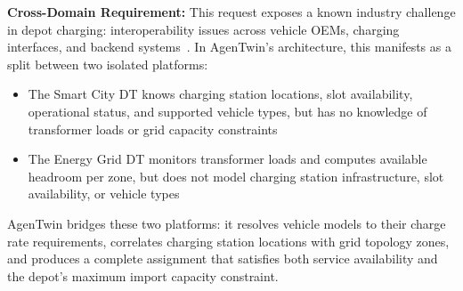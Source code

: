 \textbf{Cross-Domain Requirement:}
This request exposes a known industry challenge in depot charging:
    interoperability issues across vehicle OEMs,
    charging interfaces, and backend systems~\cite{elintacharge2026}.
In AgenTwin's architecture, this manifests as a split between two isolated platforms:

\begin{itemize}
    \item The Smart City DT knows charging station locations, slot availability,
        operational status, and supported vehicle types,
        but has no knowledge of transformer loads or grid capacity constraints
    \item The Energy Grid DT monitors transformer loads and computes available headroom per zone,
        but does not model charging station infrastructure, slot availability, or vehicle types
\end{itemize}

AgenTwin bridges these two platforms:
    it resolves vehicle models to their charge rate requirements,
    correlates charging station locations with grid topology zones,
    and produces a complete assignment that satisfies both service availability
    and the depot's maximum import capacity constraint.

